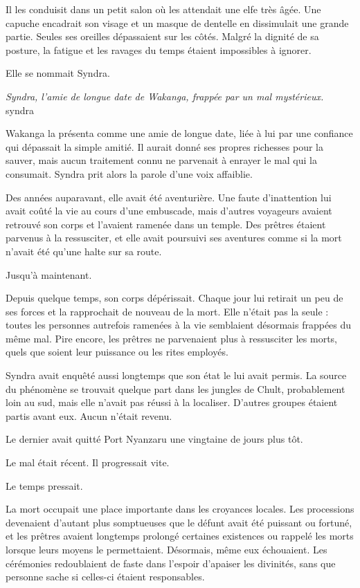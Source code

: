 Il les conduisit dans un petit salon où les attendait une elfe très âgée. Une capuche encadrait son visage et un masque de dentelle en dissimulait une grande partie. Seules ses oreilles dépassaient sur les côtés. Malgré la dignité de sa posture, la fatigue et les ravages du temps étaient impossibles à ignorer.

Elle se nommait Syndra.

{\textit{Syndra, l'amie de longue date de Wakanga, frappée par un mal mystérieux.}}
{syndra}

Wakanga la présenta comme une amie de longue date, liée à lui par une confiance qui dépassait la simple amitié. Il aurait donné ses propres richesses pour la sauver, mais aucun traitement connu ne parvenait à enrayer le mal qui la consumait. Syndra prit alors la parole d'une voix affaiblie.

Des années auparavant, elle avait été aventurière. Une faute d'inattention lui avait coûté la vie au cours d'une embuscade, mais d'autres voyageurs avaient retrouvé son corps et l'avaient ramenée dans un temple. Des prêtres étaient parvenus à la ressusciter, et elle avait poursuivi ses aventures comme si la mort n'avait été qu'une halte sur sa route.

Jusqu'à maintenant.

Depuis quelque temps, son corps dépérissait. Chaque jour lui retirait un peu de ses forces et la rapprochait de nouveau de la mort. Elle n'était pas la seule : toutes les personnes autrefois ramenées à la vie semblaient désormais frappées du même mal. Pire encore, les prêtres ne parvenaient plus à ressusciter les morts, quels que soient leur puissance ou les rites employés.

Syndra avait enquêté aussi longtemps que son état le lui avait permis. La source du phénomène se trouvait quelque part dans les jungles de Chult, probablement loin au sud, mais elle n'avait pas réussi à la localiser. D'autres groupes étaient partis avant eux. Aucun n'était revenu.

Le dernier avait quitté Port Nyanzaru une vingtaine de jours plus tôt.

Le mal était récent. Il progressait vite.

Le temps pressait.

\scenebreak

La mort occupait une place importante dans les croyances locales. Les processions devenaient d'autant plus somptueuses que le défunt avait été puissant ou fortuné, et les prêtres avaient longtemps prolongé certaines existences ou rappelé les morts lorsque leurs moyens le permettaient. Désormais, même eux échouaient. Les cérémonies redoublaient de faste dans l'espoir d'apaiser les divinités, sans que personne sache si celles-ci étaient responsables.

